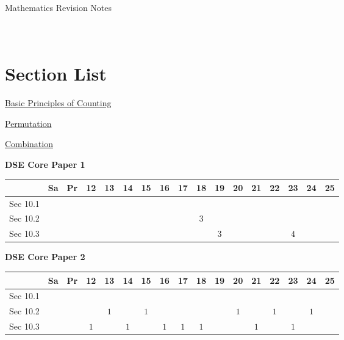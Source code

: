 \documentclass[12pt, a4paper]{article}
\begin{document}
\newpage
\newpage
\thispagestyle{empty}
\begin{center}
Mathematics Revision Notes\\\vspace{1cm}
\\\vspace{1cm}
{\fontsize{24pt}{24pt}\selectfont {Permutation and Combination \NF}} \\\vspace{1cm}
\label{chapter:S5-10}

\end{center}
\vspace{0.5cm}
\hline
\section*{Section List}
\begin{enumx}[label=Sec 10.\arabic*\ ]
\item \hyperref[section:5-10-1]{Basic Principles of Counting \NF}
\item \hyperref[section:5-10-2]{Permutation \NF}
\item \hyperref[section:5-10-3]{Combination \NF}
\end{enumx}
\begin{absolutelynopagebreak}
\begin{center}
\textbf{DSE Core Paper 1}
\end{center}
\begin{center}
\begin{tabular}{|l|c|c|c|c|c|c|c|c|c|c|c|c|c|c|c|c|}
\hline
        & Sa & Pr & 12 & 13 & 14 & 15 & 16 & 17 & 18 & 19 & 20 & 21 & 22 & 23 & 24 & 25 \\\hline\hline
Sec 10.1 &  &  &  &  &  &  &  &  &  &  &  &  &  &  &  &  \\\hline
Sec 10.2 &  &  &  &  &  &  &  &  &  $3$ &  &  &  &  &  &  &  \\\hline
Sec 10.3 &  &  &  &  &  &  &  &  &  &  $3$ &  &  &  &  $4$ &  &  \\\hline
\end{tabular}
\end{center}
\end{absolutelynopagebreak}
\begin{absolutelynopagebreak}
\begin{center}
\textbf{DSE Core Paper 2}
\end{center}
\begin{center}
\begin{tabular}{|l|c|c|c|c|c|c|c|c|c|c|c|c|c|c|c|c|}
\hline
        & Sa & Pr & 12 & 13 & 14 & 15 & 16 & 17 & 18 & 19 & 20 & 21 & 22 & 23 & 24 & 25 \\\hline\hline
Sec 10.1 &  &  &  &  &  &  &  &  &  &  &  &  &  &  &  &  \\\hline
Sec 10.2 &  &  &  &  $1$ &  &  $1$ &  &  &  &  &  $1$ &  &  $1$ &  &  $1$ &  \\\hline
Sec 10.3 &  &  &  $1$ &  &  $1$ &  &  $1$ &  $1$ &  $1$ &  &  &  $1$ &  &  $1$ &  &  \\\hline
\end{tabular}
\end{center}
\end{absolutelynopagebreak}
\end{document}
